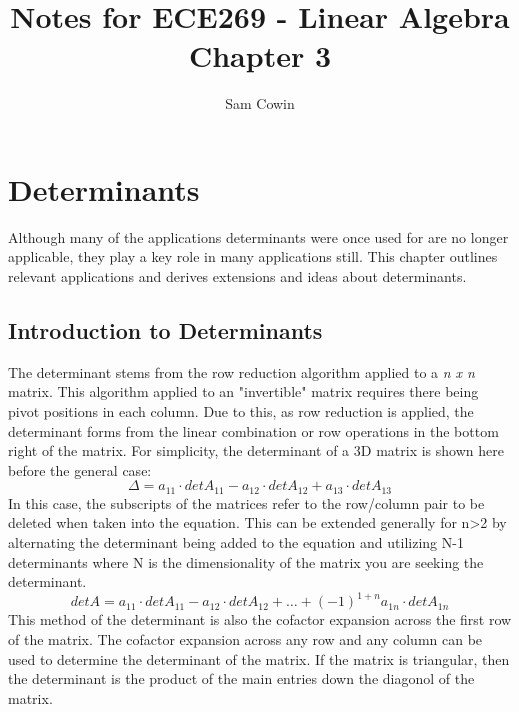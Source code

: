 \documentclass[12pt]{article}
\begin{document}
\setlength{\abovedisplayskip}{0pt}
\setlength{\belowdisplayskip}{0pt}
\setlength{\abovedisplayshortskip}{0pt}
\setlength{\belowdisplayshortskip}{0pt}

\title{Notes for ECE269 - Linear Algebra \\
\large Chapter 3}
\author{Sam Cowin}
\maketitle

\section{Determinants}
Although many of the applications determinants were once used for are no longer applicable, they play a key role in many applications still. This chapter outlines %
relevant applications and derives extensions and ideas about determinants. 
\subsection{Introduction to Determinants}
The determinant stems from the row reduction algorithm applied to a \textit{n x n} matrix. This algorithm applied to an "invertible" matrix requires there %
being pivot positions in each column. Due to this, as row reduction is applied, the determinant forms from the linear combination or row operations in the bottom right %
of the matrix. 
\newline
\newline
For simplicity, the determinant of a 3D matrix is shown here before the general case: 
\newline
$$
\Delta=a_{11}\cdot detA_{11}-a_{12}\cdot detA_{12}+a_{13}\cdot detA_{13}
$$
\newline
In this case, the subscripts of the matrices refer to the row/column pair to be deleted when taken into the equation. This can be extended generally for n>2 %
by alternating the determinant being added to the equation and utilizing N-1 determinants where N is the dimensionality of the matrix you are seeking the determinant. %
\newline
$$
detA=a_{11}\cdot detA_{11}-a_{12}\cdot detA_{12}+\dots+(-1)^{1+n}a_{1n}\cdot detA_{1n}
$$
\newline
This method of the determinant is also the cofactor expansion across the first row of the matrix. The cofactor expansion across any row and any column can be used to %
determine the determinant of the matrix. If the matrix is triangular, then the determinant is the product of the main entries down the diagonol of the matrix. 
\end{document}
